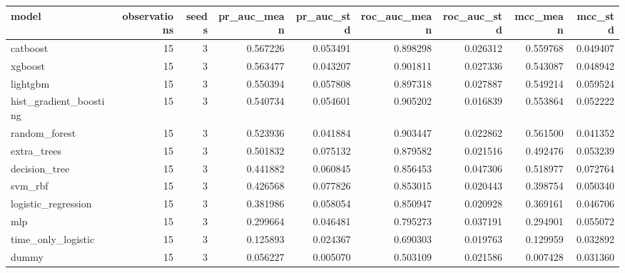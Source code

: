 \begin{tabular}{lrrrrrrrr}
\toprule
model & observations & seeds & pr\_auc\_mean & pr\_auc\_std & roc\_auc\_mean & roc\_auc\_std & mcc\_mean & mcc\_std \\
\midrule
catboost & 15 & 3 & 0.567226 & 0.053491 & 0.898298 & 0.026312 & 0.559768 & 0.049407 \\
xgboost & 15 & 3 & 0.563477 & 0.043207 & 0.901811 & 0.027336 & 0.543087 & 0.048942 \\
lightgbm & 15 & 3 & 0.550394 & 0.057808 & 0.897318 & 0.027887 & 0.549214 & 0.059524 \\
hist\_gradient\_boosting & 15 & 3 & 0.540734 & 0.054601 & 0.905202 & 0.016839 & 0.553864 & 0.052222 \\
random\_forest & 15 & 3 & 0.523936 & 0.041884 & 0.903447 & 0.022862 & 0.561500 & 0.041352 \\
extra\_trees & 15 & 3 & 0.501832 & 0.075132 & 0.879582 & 0.021516 & 0.492476 & 0.053239 \\
decision\_tree & 15 & 3 & 0.441882 & 0.060845 & 0.856453 & 0.047306 & 0.518977 & 0.072764 \\
svm\_rbf & 15 & 3 & 0.426568 & 0.077826 & 0.853015 & 0.020443 & 0.398754 & 0.050340 \\
logistic\_regression & 15 & 3 & 0.381986 & 0.058054 & 0.850947 & 0.020928 & 0.369161 & 0.046706 \\
mlp & 15 & 3 & 0.299664 & 0.046481 & 0.795273 & 0.037191 & 0.294901 & 0.055072 \\
time\_only\_logistic & 15 & 3 & 0.125893 & 0.024367 & 0.690303 & 0.019763 & 0.129959 & 0.032892 \\
dummy & 15 & 3 & 0.056227 & 0.005070 & 0.503109 & 0.021586 & 0.007428 & 0.031360 \\
\bottomrule
\end{tabular}
